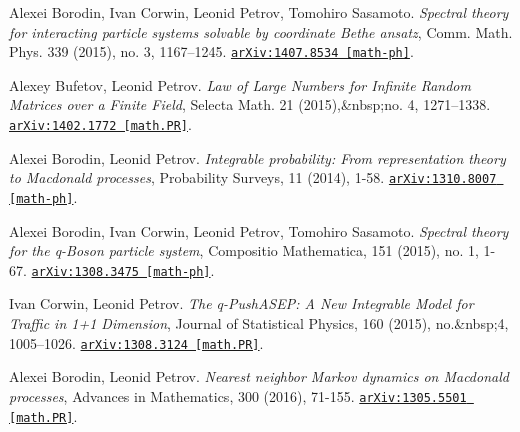\begin{etaremune}
\item 
Alexei Borodin, Ivan Corwin, Leonid Petrov, Tomohiro Sasamoto.
\emph{Spectral theory for interacting particle systems solvable by coordinate Bethe ansatz}, Comm. Math. Phys. 339 (2015), no. 3, 1167–1245. 
\href{https://arxiv.org/abs/1407.8534}{\texttt{arXiv:1407.8534 [math-ph]}}.





\item 
Alexey Bufetov, Leonid Petrov.
\emph{Law of Large Numbers for Infinite Random Matrices over a Finite Field}, Selecta Math. 21 (2015),&nbsp;no. 4, 1271–1338. 
\href{https://arxiv.org/abs/1402.1772}{\texttt{arXiv:1402.1772 [math.PR]}}.













\item 
Alexei Borodin, Leonid Petrov.
\emph{Integrable probability: From representation theory to Macdonald processes}, Probability Surveys, 11 (2014), 1-58. 
\href{https://arxiv.org/abs/1310.8007}{\texttt{arXiv:1310.8007 [math-ph]}}.





\item 
Alexei Borodin, Ivan Corwin, Leonid Petrov, Tomohiro Sasamoto.
\emph{Spectral theory for the q-Boson particle system}, Compositio Mathematica, 151 (2015), no. 1, 1-67. 
\href{https://arxiv.org/abs/1308.3475}{\texttt{arXiv:1308.3475 [math-ph]}}.



\item 
Ivan Corwin, Leonid Petrov.
\emph{The q-PushASEP: A New Integrable Model for Traffic in 1+1 Dimension}, Journal of Statistical Physics, 160 (2015), no.&nbsp;4, 1005–1026. 
\href{https://arxiv.org/abs/1308.3124}{\texttt{arXiv:1308.3124 [math.PR]}}.





\item 
Alexei Borodin, Leonid Petrov.
\emph{Nearest neighbor Markov dynamics on Macdonald processes}, Advances in Mathematics, 300 (2016), 71-155. 
\href{https://arxiv.org/abs/1305.5501}{\texttt{arXiv:1305.5501 [math.PR]}}.










\end{etaremune}
